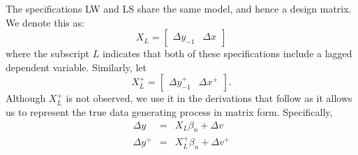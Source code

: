 The specifications LW and LS share the same model, and hence a design matrix. We denote this as:
	\begin{equation}
	X_L = \left[\begin{array}{cc}  \Delta y_{-1} & \Delta x \end{array}\right]
	\end{equation}
where the subscript $L$ indicates that both of these specifications include a lagged dependent variable.
Similarly, let
\begin{equation}
	X_L^+ = \left[ \begin{array}{cc}\Delta y_{-1}^+ & \Delta x^+ \end{array} \right].
\end{equation}
Although $X_L^+$ is not observed, we use it in the derivations that follow as it allows us to represent the true data generating process in matrix form.
Specifically, 
	\begin{eqnarray}
	\label{eq:DGP}
		\Delta y &=& X_L \beta_n + \Delta v\\
		\label{eq:DGPplus}
		\Delta y^+ &=& X_L^+ \beta_n + \Delta v^+
	\end{eqnarray}

